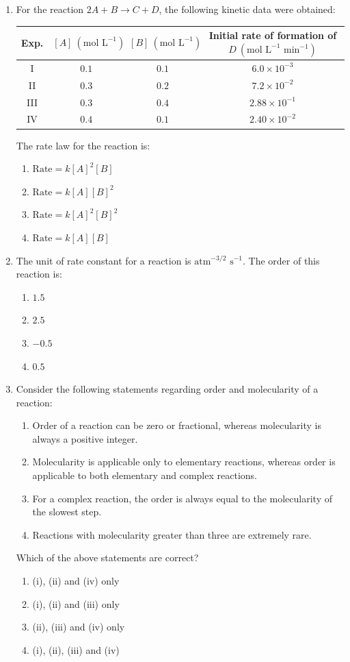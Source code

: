 \documentclass[11pt, a4paper]{article}
\begin{document}
\begin{enumerate}
\item For the reaction $2A + B \rightarrow C + D$, the following kinetic data were obtained:
\begin{center}
\begin{tabular}{|c|c|c|c|}
\hline
\textbf{Exp.} & $[A]\ (\text{mol L}^{-1})$ & $[B]\ (\text{mol L}^{-1})$ & \textbf{Initial rate of formation of } $D\ (\text{mol L}^{-1}\text{ min}^{-1})$ \\
\hline
I & $0.1$ & $0.1$ & $6.0 \times 10^{-3}$ \\
II & $0.3$ & $0.2$ & $7.2 \times 10^{-2}$ \\
III & $0.3$ & $0.4$ & $2.88 \times 10^{-1}$ \\
IV & $0.4$ & $0.1$ & $2.40 \times 10^{-2}$ \\
\hline
\end{tabular}
\end{center}
The rate law for the reaction is:
\begin{enumerate}
    \item $\text{Rate} = k[A]^2[B]$
    \item $\text{Rate} = k[A][B]^2$
    \item $\text{Rate} = k[A]^2[B]^2$
    \item $\text{Rate} = k[A][B]$
\end{enumerate}

\item The unit of rate constant for a reaction is $\text{atm}^{-3/2}\text{ s}^{-1}$. The order of this reaction is:
\begin{enumerate}
    \item $1.5$
    \item $2.5$
    \item $-0.5$
    \item $0.5$
\end{enumerate}

\item Consider the following statements regarding order and molecularity of a reaction:
\begin{enumerate}[label=(\roman*)]
    \item Order of a reaction can be zero or fractional, whereas molecularity is always a positive integer.
    \item Molecularity is applicable only to elementary reactions, whereas order is applicable to both elementary and complex reactions.
    \item For a complex reaction, the order is always equal to the molecularity of the slowest step.
    \item Reactions with molecularity greater than three are extremely rare.
\end{enumerate}
Which of the above statements are correct?
\begin{enumerate}
    \item (i), (ii) and (iv) only
    \item (i), (ii) and (iii) only
    \item (ii), (iii) and (iv) only
    \item (i), (ii), (iii) and (iv)
\end{enumerate}


\end{enumerate}
\end{document}

